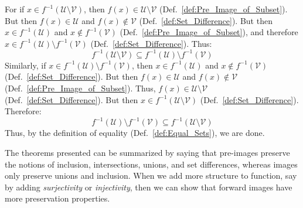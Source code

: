     \begin{bproof}
        For if $x\in{f}^{\minus{1}}(\mathcal{U}\setminus\mathcal{V})$, then
        $f(x)\in\mathcal{U}\setminus\mathcal{V}$
        (Def.~\ref{def:Pre_Image_of_Subset}). But then $f(x)\in\mathcal{U}$
        and $f(x)\notin\mathcal{V}$ (Def.~\ref{def:Set_Difference}). But then
        $x\in{f}^{\minus{1}}(\mathcal{U})$ and
        $x\notin{f}^{\minus{1}}(\mathcal{V})$
        (Def.~\ref{def:Pre_Image_of_Subset}), and therefore
        $x\in{f}^{\minus{1}}(\mathcal{U})\setminus{f}^{\minus{1}}(\mathcal{V})$
        (Def.~\ref{def:Set_Difference}). Thus:
        \begin{equation}
            f^{\minus{1}}(\mathcal{U}\setminus\mathcal{V})\subseteq
            f^{\minus{1}}(\mathcal{U})\setminus{f}^{\minus{1}}(\mathcal{V})
        \end{equation}
        Similarly, if
        $x\in{f}^{\minus{1}}(\mathcal{U})\setminus{f}^{\minus{1}}(\mathcal{V})$,
        then $x\in{f}^{\minus{1}}(\mathcal{U})$ and
        $x\notin{f}^{\minus{1}}(\mathcal{V})$ (Def.~\ref{def:Set_Difference}).
        But then $f(x)\in\mathcal{U}$ and $f(x)\notin\mathcal{V}$
        (Def.~\ref{def:Pre_Image_of_Subset}). Thus,
        $f(x)\in\mathcal{U}\setminus\mathcal{V}$
        (Def.~\ref{def:Set_Difference}). But then
        $x\in{f}^{\minus{1}}(\mathcal{U}\setminus\mathcal{V})$
        (Def.~\ref{def:Set_Difference}). Therefore:
        \begin{equation}
            f^{\minus{1}}(\mathcal{U})\setminus{f}^{\minus{1}}(\mathcal{V})
            \subseteq{f}^{\minus{1}}(\mathcal{U}\setminus\mathcal{V})
        \end{equation}
        Thus, by the definition of equality (Def.~\ref{def:Equal_Sets}), we are
        done.
    \end{bproof}
    The theorems presented can be summarized by saying that pre-images preserve
    the notions of inclusion, intersections, unions, and set differences,
    whereas images only preserve unions and inclusion. When we add more
    structure to function, say by adding \textit{surjectivity} or
    \textit{injectivity}, then we can show that forward images have more
    preservation properties.
